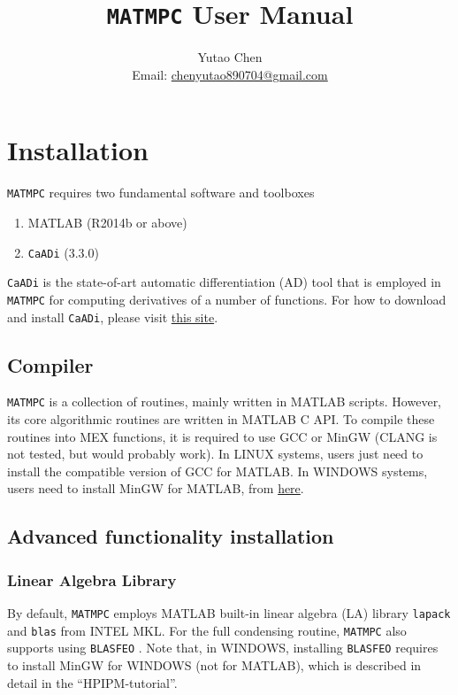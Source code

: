 \documentclass{article}
\newcommand{\software}[1]{{\tt#1}}
\begin{document}
	\title{\software{MATMPC} User Manual}
	\author{Yutao Chen\\ Email: \href{mailto:chenyutao890704@gmail.com}{chenyutao890704@gmail.com}}
	
	\maketitle
	
	\tableofcontents
	
	\newpage
	
\section{Installation}
\software{MATMPC} requires two fundamental software and toolboxes
\begin{enumerate}
	\item MATLAB (R2014b or above) 
	\item \software{CaADi} (3.3.0)
\end{enumerate}
\software{CaADi} is the state-of-art automatic differentiation (AD) tool \cite{andersson2018casadi} that is employed in \software{MATMPC} for computing derivatives of a number of functions. For how to download and install \software{CaADi}, please visit \href{https://github.com/casadi/casadi/wiki/InstallationInstructions}{this site}.

\subsection{Compiler}
\software{MATMPC} is a collection of routines, mainly written in MATLAB scripts. However, its core algorithmic routines are written in MATLAB C API. To compile these routines into MEX functions, it is required to use GCC or MinGW (CLANG is not tested, but would probably work). In LINUX systems, users just need to install the compatible version of GCC for MATLAB. In WINDOWS systems, users need to install MinGW for MATLAB, from \href{https://www.mathworks.com/matlabcentral/fileexchange/52848-matlab-support-for-mingw-w64-c-c-compiler}{here}.

\subsection{Advanced functionality installation}

\subsubsection{Linear Algebra Library}
By default, \software{MATMPC} employs MATLAB built-in linear algebra (LA) library \software{lapack} and \software{blas} from INTEL MKL. For the full condensing routine, \software{MATMPC} also supports using \software{BLASFEO} \cite{frison2018blasfeo}. Note that, in WINDOWS, installing \software{BLASFEO} requires to install MinGW for WINDOWS (not for MATLAB), which is described in detail in the ``HPIPM-tutorial''.
\end{document}
